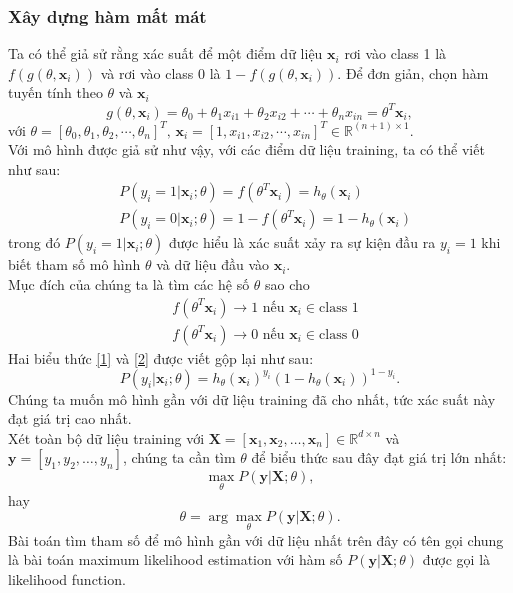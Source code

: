 \documentclass[]{article}
\begin{document}
\subsubsection{Xây dựng hàm mất mát}
Ta có thể giả sử rằng xác suất để một điểm dữ liệu $\textbf{x}_i$ rơi vào class 1 là $f(g(\theta, \textbf{x}_i))$ và rơi vào class 0 là $1-f(g(\theta, \textbf{x}_i))$. Để đơn giản, chọn hàm tuyến tính theo $\theta$ và $\textbf{x}_i$
$$g(\theta, \textbf{x}_i)=\theta_0+\theta_1x_{i1}+\theta_2x_{i2}+\cdots+\theta_nx_{in}=\theta^T\textbf{x}_i,$$ 
với $\theta=[\theta_0, \theta_1, \theta_2,\cdots,\theta_n]^T,\, \textbf{x}_i=[1, x_{i1}, x_{i2}, \cdots, x_{in}]^T\in \mathbb{R}^{(n+1)\times1}$. 
\\
Với mô hình được giả sử như vậy, với các điểm dữ liệu training, ta có thể viết như sau:
\begin{align}
	&P(y_i = 1 | \mathbf{x}_i; \theta) = f(\theta^T\mathbf{x}_i)=h_\theta(\textbf{x}_i) \label{1} \\
	&P(y_i = 0 | \mathbf{x}_i; \theta) = 1 - f(\theta^T\mathbf{x}_i)=1-h_\theta(\textbf{x}_i) \label{2}
\end{align}
trong đó $	P(y_i = 1 | \mathbf{x}_i; \theta)$ được hiểu là xác suất xảy ra sự kiện đầu ra $y_i=1$ khi biết tham số mô hình $\theta$ và dữ liệu đầu vào $\textbf{x}_i$.
\\ 
Mục đích của chúng ta là tìm các hệ số $\theta$ sao cho 
\begin{align*}
	&f(\theta^T\textbf{x}_i)\to 1 \text{ nếu } \textbf{x}_i\in \text{class 1}\\
	&f(\theta^T\textbf{x}_i)\to 0 \text{ nếu } \textbf{x}_i\in \text{class 0}
\end{align*}
Hai biểu thức \eqref{1} và \eqref{2} được viết gộp lại như sau:
$$P(y_i| \mathbf{x}_i; \theta) = h_\theta(\textbf{x}_i)^{y_i}(1 - h_\theta(\textbf{x}_i))^{1- y_i}.$$
Chúng ta muốn mô hình gần với dữ liệu training đã cho nhất, tức xác suất này đạt giá trị cao nhất.
\\
Xét toàn bộ dữ liệu training với $\mathbf{X} = [\mathbf{x}_1,\mathbf{x}_2, \dots, \mathbf{x}_n] \in \mathbb{R}^{d \times n}$ và $\mathbf{y} = [y_1, y_2, \dots, y_n]$, chúng ta cần tìm $\theta$ để biểu thức sau đây đạt giá trị lớn nhất:
$$\max_{\theta} P(\mathbf{y}|\mathbf{X}; \theta),$$
hay 
$$\theta = \arg\max_{\theta} P(\mathbf{y}|\mathbf{X}; \theta).$$
Bài toán tìm tham số để mô hình gần với dữ liệu nhất trên đây có tên gọi chung là bài toán maximum likelihood estimation với hàm số $P(\mathbf{y}|\mathbf{X}; \theta)$ được gọi là likelihood function. 
\end{document}
